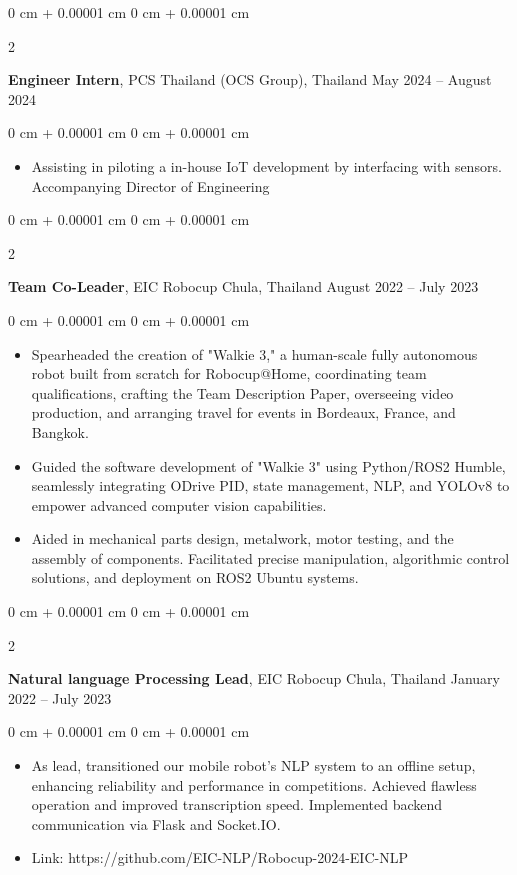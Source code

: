 \documentclass[10pt, letterpaper]{article}
\newenvironment{highlights}{
    \begin{itemize}[
        topsep=0.0 cm,
        parsep=0.0 cm,
        partopsep=0pt,
        itemsep=0pt,
        leftmargin=0 cm + 10pt
    ]
}{
    \end{itemize}
} %
\newenvironment{onecolentry}{
    \begin{adjustwidth}{
        0 cm + 0.00001 cm
    }{
        0 cm + 0.00001 cm
    }
}{
    \end{adjustwidth}
} %
\newenvironment{twocolentry}[2][]{
    \onecolentry
    \def\secondColumn{#2}
    \setcolumnwidth{\fill, 4.5 cm}
    \begin{paracol}{2}
}{
    \switchcolumn \raggedleft \secondColumn
    \end{paracol}
    \endonecolentry
} %
\begin{document}
        \vspace{0.2 cm}
        \begin{twocolentry}{May 2024 – August 2024}
        \textbf{Engineer Intern}, PCS Thailand (OCS Group), Thailand\end{twocolentry}
        \vspace{0.10 cm}
        \begin{onecolentry}\begin{highlights}
            \item Assisting in piloting a in-house IoT development by interfacing with sensors. Accompanying Director of Engineering 
        \end{highlights}\end{onecolentry}

        \vspace{0.2 cm}
        \begin{twocolentry}{August 2022 – July 2023}
        \textbf{Team Co-Leader}, EIC Robocup Chula, Thailand\end{twocolentry}
        \vspace{0.10 cm}
        \begin{onecolentry}\begin{highlights}
            \item Spearheaded the creation of "Walkie 3," a human-scale fully autonomous robot built from scratch for Robocup@Home, coordinating team qualifications, crafting the Team Description Paper, overseeing video production, and arranging travel for events in Bordeaux, France, and Bangkok.
            \item Guided the software development of "Walkie 3" using Python/ROS2 Humble, seamlessly integrating ODrive PID, state management, NLP, and YOLOv8 to empower advanced computer vision capabilities.
            \item Aided in mechanical parts design, metalwork, motor testing, and the assembly of components. Facilitated precise manipulation, algorithmic control solutions, and deployment on ROS2 Ubuntu systems.
        \end{highlights}\end{onecolentry}

        \vspace{0.2 cm}
        \begin{twocolentry}{January 2022 – July 2023}
        \textbf{Natural language Processing Lead}, EIC Robocup Chula, Thailand\end{twocolentry}
        \vspace{0.10 cm}
        \begin{onecolentry}\begin{highlights}
            \item As lead, transitioned our mobile robot's NLP system to an offline setup, enhancing reliability and performance in competitions. Achieved flawless operation and improved transcription speed. Implemented backend communication via Flask and Socket.IO.
            \item Link: https://github.com/EIC-NLP/Robocup-2024-EIC-NLP

        \end{highlights}\end{onecolentry}
\end{document}
